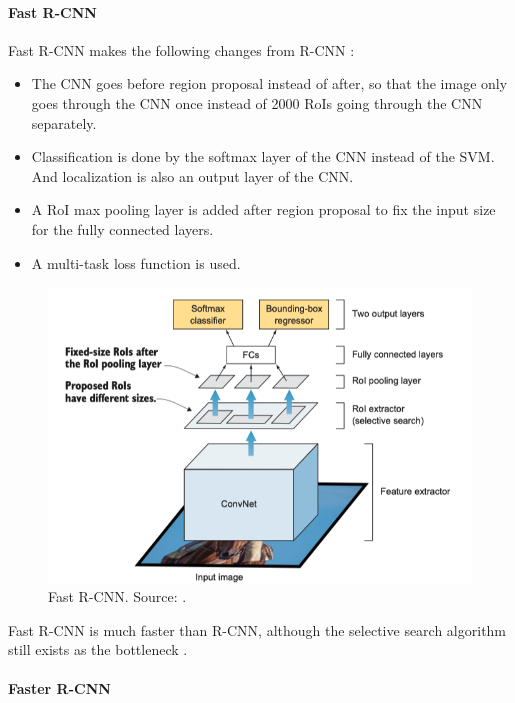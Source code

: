 \documentclass[a4paper, 11pt, oneside]{article}
\begin{document}
  \paragraph{Fast R-CNN}

  Fast R-CNN makes the following changes from R-CNN \cite{elgendy2020deep, girshick2015fast}:

  \begin{itemize}
    \item The CNN goes before region proposal instead of after, so that the image only goes through the CNN once instead
    of 2000 RoIs going through the CNN separately.
    \item Classification is done by the softmax layer of the CNN instead of the SVM. And localization is also an output
    layer of the CNN.
    \item A RoI max pooling layer is added after region proposal to fix the input size for the fully connected layers.
    \item A multi-task loss function is used.
  \end{itemize}

  \begin{figure}[ht]
    \begin{center}
      \includegraphics[width=.8\textwidth]{fast_r_cnn.png}
    \end{center}
    \caption{Fast R-CNN. Source: \cite{elgendy2020deep}.}
  \end{figure}

  Fast R-CNN is much faster than R-CNN, although the selective search algorithm still exists as the bottleneck
  \cite{elgendy2020deep, girshick2015fast, ren2015faster}.

  \paragraph{Faster R-CNN}
\end{document}
